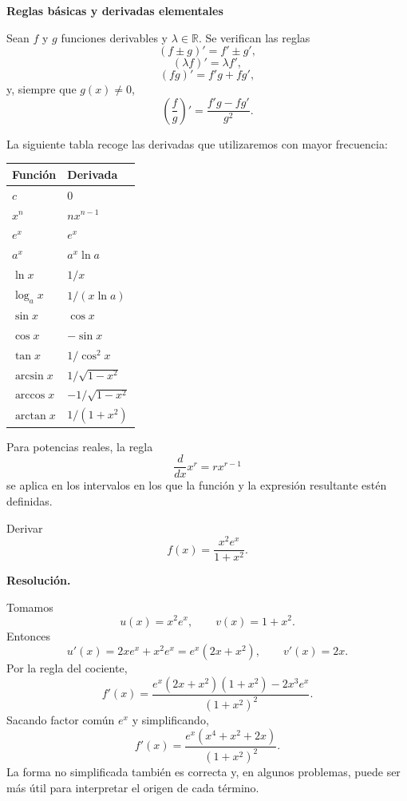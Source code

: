 \textbf{Reglas básicas y derivadas elementales}

Sean $f$ y $g$ funciones derivables y $\lambda\in\mathbb{R}$. Se verifican las reglas
\[
(f\pm g)'=f'\pm g',
\]
\[
(\lambda f)'=\lambda f',
\]
\[
(fg)'=f'g+fg',
\]
y, siempre que $g(x)\neq0$,
\[
\left(\frac{f}{g}\right)'
=
\frac{f'g-fg'}{g^2}.
\]

La siguiente tabla recoge las derivadas que utilizaremos con mayor frecuencia:

\begin{center}

\begin{tabular}{@{}ll@{}}
\toprule
Función & Derivada \\
\midrule
$c$ & $0$ \\
$x^n$ & $nx^{n-1}$ \\
$e^x$ & $e^x$ \\
$a^x$ & $a^x\ln a$ \\
$\ln x$ & $1/x$ \\
$\log_a x$ & $1/(x\ln a)$ \\
$\sin x$ & $\cos x$ \\
$\cos x$ & $-\sin x$ \\
$\tan x$ & $1/\cos^2x$ \\
$\arcsin x$ & $1/\sqrt{1-x^2}$ \\
$\arccos x$ & $-1/\sqrt{1-x^2}$ \\
$\arctan x$ & $1/(1+x^2)$ \\
\bottomrule
\end{tabular}
\end{center}

Para potencias reales, la regla
\[
\frac{d}{dx}x^r=rx^{r-1}
\]
se aplica en los intervalos en los que la función y la expresión resultante estén definidas.

\begin{solvedexercise}
Derivar
\[
f(x)=\frac{x^2e^x}{1+x^2}.
\]

\textbf{Resolución.}\par\smallskip
Tomamos
\[
u(x)=x^2e^x,
\qquad
v(x)=1+x^2.
\]
Entonces
\[
u'(x)=2xe^x+x^2e^x=e^x(2x+x^2),
\qquad
v'(x)=2x.
\]
Por la regla del cociente,
\[
f'(x)=
\frac{e^x(2x+x^2)(1+x^2)-2x^3e^x}{(1+x^2)^2}.
\]
Sacando factor común $e^x$ y simplificando,
\[
\boxed{
f'(x)=\frac{e^x(x^4+x^2+2x)}{(1+x^2)^2}
}.
\]
La forma no simplificada también es correcta y, en algunos problemas, puede ser más útil para interpretar el origen de cada término.
\end{solvedexercise}


